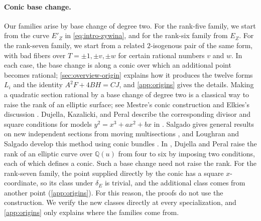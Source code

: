 \documentclass[12pt,oneside,openany]{book}
\theoremstyle{definition}
\theoremstyle{plain}
\numberwithin{equation}{chapter}
\theoremstyle{plain}
\theoremstyle{definition}
\theoremstyle{remark}
\newcommand{\Q}{\mathbb Q}
\begin{document}
\paragraph{Conic base change.} Our families arise by base change of degree two. For the rank-five family, we start from the curve $E'_Z$ in \eqref{eq:intro-zywina}, and for the rank-six family from $E_Z$. For the rank-seven family, we start from a related $2$-isogenous pair of the same form, with bad fibers over $T=\pm1,\pm v,\pm w$ for certain rational numbers $v$ and $w$. In each case, the base change is along a conic over which an additional point becomes rational; \cref{sec:overview-origin} explains how it produces the twelve forms $L_i$ and the identity $A^2F+4BH=CJ$, and \cref{app:origins} gives the details. Making a quadratic section rational by a base change of degree two is a classical way to raise the rank of an elliptic surface; see Mestre's conic construction \cite[\S2.2]{Mestre1991} and Elkies's discussion \cite[Lecture~III, p.~2003]{Elkies2007}. Dujella, Kazalicki, and Peral describe the corresponding divisor and square conditions for models $y^2=x^3+ax^2+bx$ in \cite[\S1.1]{DujellaKazalickiPeral2021}. Salgado gives general results on new independent sections from moving multisections \cite[Corollary~4.3]{Salgado2012}, and Loughran and Salgado develop this method using conic bundles \cite[\S1.2 and Theorem~2.4]{LoughranSalgado2022}. In \cite[\S4]{DujellaPeral2024}, Dujella and Peral raise the rank of an elliptic curve over $\Q(u)$ from four to six by imposing two conditions, each of which defines a conic. Such a base change need not raise the rank. For the rank-seven family, the point supplied directly by the conic has a square $x$-coordinate, so its class under $\delta_E$ is trivial, and the additional class comes from another point (\cref{app:origins}). For this reason, the proofs do not use the construction. We verify the new classes directly at every specialization, and \cref{app:origins} only explains where the families come from.
\end{document}
